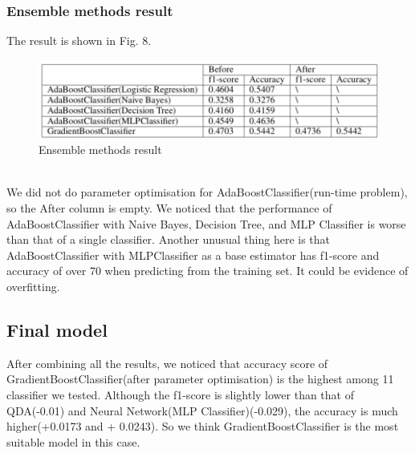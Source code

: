 \documentclass{article}
\begin{document}
\subsubsection{Ensemble methods result}
The result is shown in Fig. 8.\\
\begin{figure}[ht]
\centering
\includegraphics[scale=0.7]{graphs/ensemble_result_table.png}
\caption{Ensemble methods result}
\label{fig:confusion_matrix}
\end{figure}\\
We did not do parameter optimisation for AdaBoostClassifier(run-time problem), so the After column is empty. We noticed that the performance of AdaBoostClassifier with Naive Bayes, Decision Tree, and MLP Classifier is worse than that of a single classifier. Another unusual thing here is that AdaBoostClassifier with MLPClassifier as a base estimator has f1-score and accuracy of over 70 when predicting from the training set. It could be evidence of overfitting.
\subsection{Final model}
After combining all the results, we noticed that accuracy score of GradientBoostClassifier(after parameter optimisation) is the highest among 11 classifier we tested. Although the f1-score is slightly lower than that of QDA(-0.01) and Neural Network(MLP Classifier)(-0.029), the accuracy is much higher(+0.0173 and + 0.0243). So we think GradientBoostClassifier is the most suitable model in this case.
\end{document}

